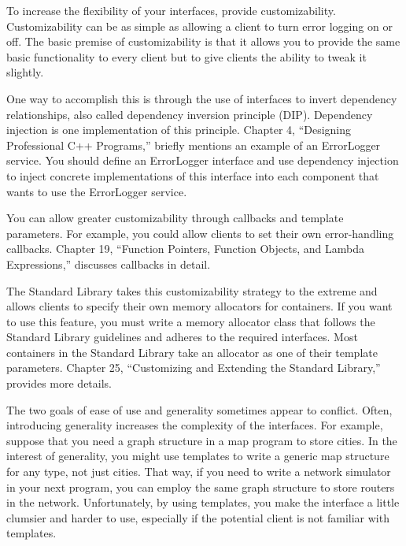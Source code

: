 
To increase the flexibility of your interfaces, provide customizability. Customizability can be as simple as allowing a client to turn error logging on or off. The basic premise of customizability is that it allows you to provide the same basic functionality to every client but to give clients the ability to tweak it slightly.

One way to accomplish this is through the use of interfaces to invert dependency relationships, also called dependency inversion principle (DIP). Dependency injection is one implementation of this principle. Chapter 4, “Designing Professional C++ Programs,” briefly mentions an example of an ErrorLogger service. You should define an ErrorLogger interface and use dependency injection to inject concrete implementations of this interface into each component that wants to use the ErrorLogger service.

You can allow greater customizability through callbacks and template parameters. For example, you could allow clients to set their own error-handling callbacks. Chapter 19, “Function Pointers, Function Objects, and Lambda Expressions,” discusses callbacks in detail.

The Standard Library takes this customizability strategy to the extreme and allows clients to specify their own memory allocators for containers. If you want to use this feature, you must write a memory allocator class that follows the Standard Library guidelines and adheres to the required interfaces. Most containers in the Standard Library take an allocator as one of their template parameters. Chapter 25, “Customizing and Extending the Standard Library,” provides more details.


The two goals of ease of use and generality sometimes appear to conflict. Often, introducing generality increases the complexity of the interfaces. For example, suppose that you need a graph structure in a map program to store cities. In the interest of generality, you might use templates to write a generic map structure for any type, not just cities. That way, if you need to write a network simulator in your next program, you can employ the same graph structure to store routers in the network. Unfortunately, by using templates, you make the interface a little clumsier and harder to use, especially if the potential client is not familiar with templates.

